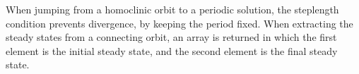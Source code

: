 \documentclass[10pt]{scrartcl}
\newcommand{\blist}[1]{\mbox{\lstinline!#1!}}
\begin{document}
{%

When jumping from a homoclinic orbit to a periodic solution, the
steplength condition prevents divergence, by keeping the period fixed.
When extracting the steady states from a connecting orbit, an array is
returned in which the first element is the initial steady state, and
the second element is the final steady state.

}
\end{document}
